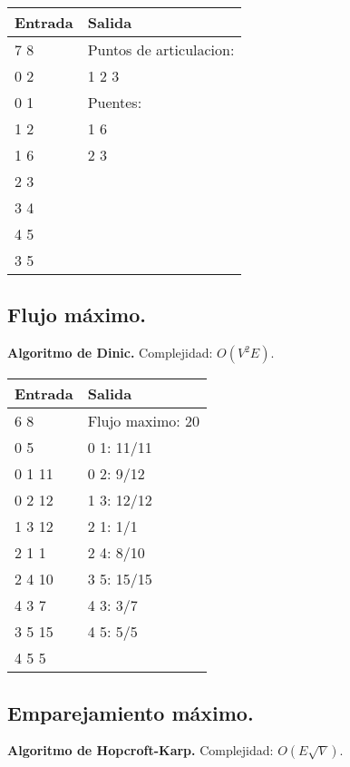\documentclass[10pt, letterpaper, twoside]{article}
\begin{document}


\begin{tabular}{|p{7cm}|p{7cm}|}
\hline
\textbf{Entrada} & \textbf{Salida} \\ \hline
7 8 & Puntos de articulacion: \\
0 2 & 1 2 3 \\
0 1 & Puentes: \\
1 2 & 1 6 \\ 
1 6 & 2 3 \\
2 3 & \\
3 4 & \\
4 5 & \\
3 5 & \\ \hline
\end{tabular}

\subsection{Flujo máximo.}

\textbf{Algoritmo de Dinic.} Complejidad: $O(V^2 E)$.



\begin{tabular}{|p{7cm}|p{7cm}|}
\hline
\textbf{Entrada} & \textbf{Salida} \\ \hline
6 8    & Flujo maximo: 20 \\
0 5    & 0 1: 11/11 \\ 
0 1 11 & 0 2: 9/12  \\
0 2 12 & 1 3: 12/12 \\
1 3 12 & 2 1: 1/1 \\
2 1 1  & 2 4: 8/10 \\
2 4 10 & 3 5: 15/15 \\
4 3 7  & 4 3: 3/7 \\
3 5 15 & 4 5: 5/5 \\
4 5 5  & \\ \hline
\end{tabular}

\subsection{Emparejamiento máximo.}

\textbf{Algoritmo de Hopcroft-Karp.} Complejidad: $O(E \sqrt{V})$.


\end{document}
